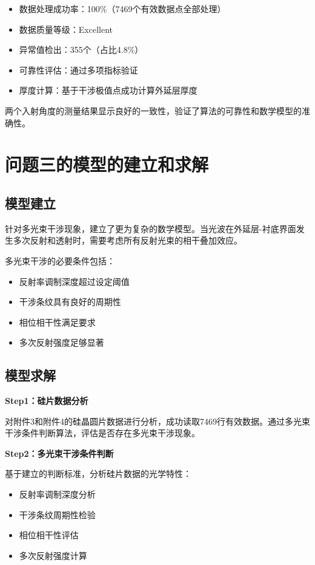 \documentclass[withoutpreface,bwprint]{cumcmthesis}
\begin{document}
\begin{itemize}[itemindent=2em]
\item 数据处理成功率：100\%（7469个有效数据点全部处理）
\item 数据质量等级：Excellent
\item 异常值检出：355个（占比4.8\%）
\item 可靠性评估：通过多项指标验证
\item 厚度计算：基于干涉极值点成功计算外延层厚度
\end{itemize}

两个入射角度的测量结果显示良好的一致性，验证了算法的可靠性和数学模型的准确性。


\section{问题三的模型的建立和求解}
\subsection{模型建立}

针对多光束干涉现象，建立了更为复杂的数学模型。当光波在外延层-衬底界面发生多次反射和透射时，需要考虑所有反射光束的相干叠加效应。

多光束干涉的必要条件包括：
\begin{itemize}[itemindent=2em]
\item 反射率调制深度超过设定阈值
\item 干涉条纹具有良好的周期性
\item 相位相干性满足要求
\item 多次反射强度足够显著
\end{itemize}

\subsection{模型求解}

\textbf{Step1：硅片数据分析} 

对附件3和附件4的硅晶圆片数据进行分析，成功读取7469行有效数据。通过多光束干涉条件判断算法，评估是否存在多光束干涉现象。

\textbf{Step2：多光束干涉条件判断} 

基于建立的判断标准，分析硅片数据的光学特性：
\begin{itemize}[itemindent=2em]
\item 反射率调制深度分析
\item 干涉条纹周期性检验
\item 相位相干性评估
\item 多次反射强度计算
\end{itemize}
\end{document}
